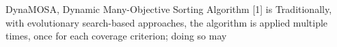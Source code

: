 DynaMOSA, Dynamic Many-Objective Sorting Algorithm [1] is 
Traditionally, with evolutionary search-based approaches, the algorithm is applied multiple times, 
once for each coverage criterion; doing so may 